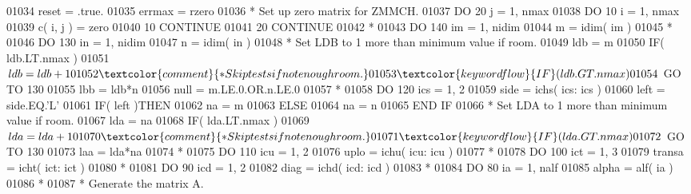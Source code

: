 \begin{DoxyCode}
01034       reset = .true.
01035       errmax = rzero
01036 \textcolor{comment}{*     Set up zero matrix for ZMMCH.}
01037       \textcolor{keywordflow}{DO} 20 j = 1, nmax
01038          \textcolor{keywordflow}{DO} 10 i = 1, nmax
01039             c( i, j ) = zero
01040    10    \textcolor{keywordflow}{CONTINUE}
01041    20 \textcolor{keywordflow}{CONTINUE}
01042 \textcolor{comment}{*}
01043       \textcolor{keywordflow}{DO} 140 im = 1, nidim
01044          m = idim( im )
01045 \textcolor{comment}{*}
01046          \textcolor{keywordflow}{DO} 130 in = 1, nidim
01047             n = idim( in )
01048 \textcolor{comment}{*           Set LDB to 1 more than minimum value if room.}
01049             ldb = m
01050             \textcolor{keywordflow}{IF}( ldb.LT.nmax )
01051      $         ldb = ldb + 1
01052 \textcolor{comment}{*           Skip tests if not enough room.}
01053             \textcolor{keywordflow}{IF}( ldb.GT.nmax )
01054      $         \textcolor{keywordflow}{GO TO} 130
01055             lbb = ldb*n
01056             null = m.LE.0.OR.n.LE.0
01057 \textcolor{comment}{*}
01058             \textcolor{keywordflow}{DO} 120 ics = 1, 2
01059                side = ichs( ics: ics )
01060                left = side.EQ.\textcolor{stringliteral}{'L'}
01061                \textcolor{keywordflow}{IF}( left )\textcolor{keywordflow}{THEN}
01062                   na = m
01063                \textcolor{keywordflow}{ELSE}
01064                   na = n
01065 \textcolor{keywordflow}{               END IF}
01066 \textcolor{comment}{*              Set LDA to 1 more than minimum value if room.}
01067                lda = na
01068                \textcolor{keywordflow}{IF}( lda.LT.nmax )
01069      $            lda = lda + 1
01070 \textcolor{comment}{*              Skip tests if not enough room.}
01071                \textcolor{keywordflow}{IF}( lda.GT.nmax )
01072      $            \textcolor{keywordflow}{GO TO} 130
01073                laa = lda*na
01074 \textcolor{comment}{*}
01075                \textcolor{keywordflow}{DO} 110 icu = 1, 2
01076                   uplo = ichu( icu: icu )
01077 \textcolor{comment}{*}
01078                   \textcolor{keywordflow}{DO} 100 ict = 1, 3
01079                      transa = icht( ict: ict )
01080 \textcolor{comment}{*}
01081                      \textcolor{keywordflow}{DO} 90 icd = 1, 2
01082                         diag = ichd( icd: icd )
01083 \textcolor{comment}{*}
01084                         \textcolor{keywordflow}{DO} 80 ia = 1, nalf
01085                            alpha = alf( ia )
01086 \textcolor{comment}{*}
01087 \textcolor{comment}{*                          Generate the matrix A.}

\end{DoxyCode}
